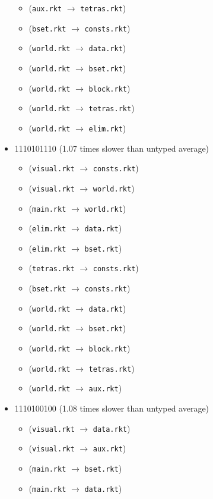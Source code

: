\documentclass{article}
\newcommand{\mono}[1]{\texttt{#1}}
\begin{document}
\begin{itemize}
\begin{itemize}
  \item (\mono{aux.rkt} $\rightarrow$ \mono{tetras.rkt})
  \item (\mono{bset.rkt} $\rightarrow$ \mono{consts.rkt})
  \item (\mono{world.rkt} $\rightarrow$ \mono{data.rkt})
  \item (\mono{world.rkt} $\rightarrow$ \mono{bset.rkt})
  \item (\mono{world.rkt} $\rightarrow$ \mono{block.rkt})
  \item (\mono{world.rkt} $\rightarrow$ \mono{tetras.rkt})
  \item (\mono{world.rkt} $\rightarrow$ \mono{elim.rkt})
  \end{itemize}
\item 1110101110 (1.07 times slower than untyped average)
  \begin{itemize}
  \item (\mono{visual.rkt} $\rightarrow$ \mono{consts.rkt})
  \item (\mono{visual.rkt} $\rightarrow$ \mono{world.rkt})
  \item (\mono{main.rkt} $\rightarrow$ \mono{world.rkt})
  \item (\mono{elim.rkt} $\rightarrow$ \mono{data.rkt})
  \item (\mono{elim.rkt} $\rightarrow$ \mono{bset.rkt})
  \item (\mono{tetras.rkt} $\rightarrow$ \mono{consts.rkt})
  \item (\mono{bset.rkt} $\rightarrow$ \mono{consts.rkt})
  \item (\mono{world.rkt} $\rightarrow$ \mono{data.rkt})
  \item (\mono{world.rkt} $\rightarrow$ \mono{bset.rkt})
  \item (\mono{world.rkt} $\rightarrow$ \mono{block.rkt})
  \item (\mono{world.rkt} $\rightarrow$ \mono{tetras.rkt})
  \item (\mono{world.rkt} $\rightarrow$ \mono{aux.rkt})
  \end{itemize}
\item 1110100100 (1.08 times slower than untyped average)
  \begin{itemize}
  \item (\mono{visual.rkt} $\rightarrow$ \mono{data.rkt})
  \item (\mono{visual.rkt} $\rightarrow$ \mono{aux.rkt})
  \item (\mono{main.rkt} $\rightarrow$ \mono{bset.rkt})
  \item (\mono{main.rkt} $\rightarrow$ \mono{data.rkt})

\end{itemize}
\end{itemize}
\end{document}
